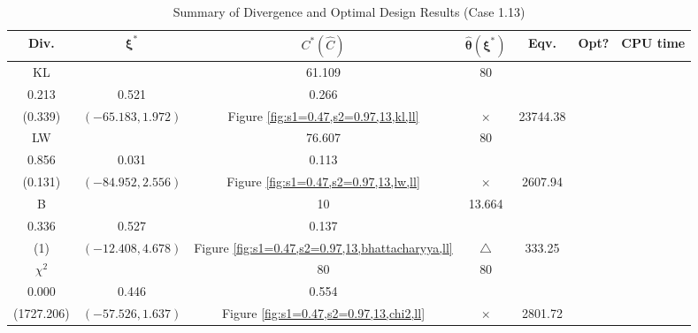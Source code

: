 \documentclass[12pt, a4paper]{article}
\begin{document}
\begin{table}[H]
\centering
\renewcommand{\arraystretch}{1.5} %
\setlength{\tabcolsep}{8pt} %
\begin{tabular}{|c|c|c|c|c|c|c|}
\hline
\textbf{Div.} & \(\boldsymbol{\xi^*}\) & \(C^* (\hat{C})\) & \(\boldsymbol{\hat{\theta}(\xi^*)}\) & \textbf{Eqv.} & \textbf{Opt?} & \textbf{CPU time} \\
\hline
KL & \(\left\{\begin{array}{ccc}
43.412 & 61.109 & 80 \\
0.213 & 0.521 & 0.266
\end{array}\right\}\) &
\(\begin{array}{c}
0.339 \\
(0.339)
\end{array}\) & 
\((-65.183, 1.972)\) & 
Figure \ref{fig:s1=0.47,s2=0.97,13,kl,ll} & $\times$ & 23744.38 \\
\hline
LW & \(\left\{\begin{array}{ccc}
69.351 & 76.607 & 80 \\
0.856 & 0.031 & 0.113
\end{array}\right\}\) &
\(\begin{array}{c}
0.695 \\
(0.131)
\end{array}\) & 
\((-84.952, 2.556)\) & 
Figure \ref{fig:s1=0.47,s2=0.97,13,lw,ll} & $\times$ & 2607.94 \\
\hline
B & \(\left\{\begin{array}{ccc}
10 & 10 & 13.664 \\
0.336 & 0.527 & 0.137
\end{array}\right\}\) &
\(\begin{array}{c}
1 \\
(1)
\end{array}\) & 
\((-12.408, 4.678)\) & 
Figure \ref{fig:s1=0.47,s2=0.97,13,bhattacharyya,ll} & $\triangle$ & 333.25 \\
\hline
\(\chi^2\) & \(\left\{\begin{array}{ccc}
70.982 & 80 & 80 \\
0.000 & 0.446 & 0.554
\end{array}\right\}\) &
\(\begin{array}{c}
8.42207\times 10^{11} \\
(1727.206)
\end{array}\) & 
\((-57.526, 1.637)\) & 
Figure \ref{fig:s1=0.47,s2=0.97,13,chi2,ll} & $\times$ & 2801.72 \\
\hline
\end{tabular}
\caption{Summary of Divergence and Optimal Design Results (Case 1.13)}
\label{tab:results1.13}
\end{table}
\end{document}
